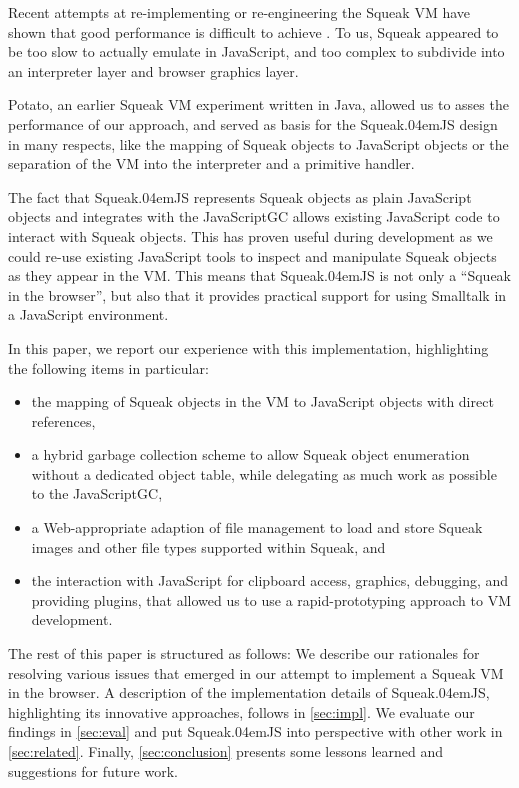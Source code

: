 \documentclass[natbib]{sigplanconf}
\newcommand*\SqueakJS{Squeak\texorpdfstring{\kern.04em}{}JS\xspace}
\newcommand*\JS{JavaScript\xspace}
\begin{document}
Recent attempts at re-implementing or re-engineering the Squeak
\ac{VM} have shown that good performance is difficult to achieve
\cite{Bolz+2008:Back-to-the-Future-in-One-Week,marr2012identifying,Wassermann13}. To
us, Squeak appeared to be too slow to actually emulate in \JS, and too
complex to subdivide into an interpreter layer and browser graphics
layer.

Potato, an earlier Squeak \ac{VM} experiment written in Java, allowed
us to asses the performance of our approach, and served
as basis for the \SqueakJS design in many respects, like the mapping
of Squeak objects to \JS objects or the separation of the
\ac{VM} into the interpreter and a primitive handler.

The fact that \SqueakJS represents Squeak objects as plain \JS
objects and integrates with the \JS \ac{GC} allows existing
\JS code to interact with Squeak objects. This has proven
useful during development as we could re-use existing \JS tools
to inspect and manipulate Squeak objects as they appear in the
\ac{VM}.  This means that \SqueakJS is not only a ``Squeak in the
browser'', but also that it provides practical support for using
Smalltalk in a \JS environment.

In this paper, we report our experience with this implementation,
highlighting the following items in particular:
\begin{itemize}
\item the mapping of Squeak objects in the \ac{VM} to \JS
  objects with direct references,
\item a hybrid garbage collection scheme to allow Squeak object
  enumeration without a dedicated object table, while delegating as
  much work as possible to the \JS \ac{GC},
\item a Web-appropriate adaption of file management to load and store
  Squeak images and other file types supported within Squeak, and
\item the interaction with \JS for clipboard access, graphics,
  debugging, and providing plugins, that allowed us to use a
  rapid-prototyping approach to \ac{VM} development.
\end{itemize}

The rest of this paper is structured as follows: We describe our
rationales for resolving various issues that emerged in our attempt to implement a
Squeak \ac{VM} in the browser. A description of the implementation
details of \SqueakJS, highlighting its innovative approaches, follows in
\autoref{sec:impl}. We evaluate our findings in \autoref{sec:eval} and
put \SqueakJS into perspective with other work in
\autoref{sec:related}. Finally, \autoref{sec:conclusion} presents some
lessons learned and suggestions for future work.
\end{document}
